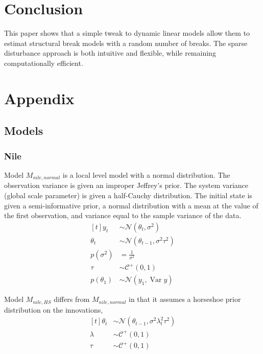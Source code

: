\documentclass{article}
\newcommand{\paren}[1]{\ensuremath{\left(#1\right)}}
\newcommand{\dnorm}[1]{\ensuremath{\mathcal{N}\paren{#1}}}
\newcommand{\dhalfcauchy}[1]{\ensuremath{\mathcal{C}^{+}\paren{#1}}}
\DeclareMathOperator{\Var}{Var}
\begin{document}
\section{Conclusion}
\label{sec:conclusion}

This paper shows that a simple tweak to dynamic linear models allow them to estimat structural break models with a random number of breaks.
The sparse disturbance approach is both intuitive and flexible, while remaining computationally efficient.

\clearpage{}
\section{Appendix}
\label{sec:appendix}

\subsection{Models}
\label{sec:models}

\subsubsection{Nile}
\label{sec:nile-1}

Model $M_{nile,normal}$ is a local level model with a normal distribution.
The observation variance is given an improper Jeffrey's prior.
The system variance (global scale parameter) is given a half-Cauchy distribution. 
The initial state is given a semi-informative prior, a normal distribution with a mean at the value of the first observation, and variance equal to the sample variance of the data.
\begin{equation}
  \label{eq:11}
  \begin{aligned}[t]
    y_{t} &\sim \dnorm{\theta_{t}, \sigma^{2}} \\
    \theta_{t} &\sim \dnorm{\theta_{t - 1}, \sigma^{2} \tau^{2}} \\
    p(\sigma^{2}) &= \frac{1}{\sigma^{2}} \\
    \tau &\sim \dhalfcauchy{0, 1} \\
    p(\theta_{1}) &\sim \dnorm{y_{1}, \Var{y}}
  \end{aligned}
\end{equation}

Model $M_{nile,HS}$ differs from $M_{nile,normal}$ in that it assumes a horseshoe prior distribution on 
the innovations,
\begin{equation}
  \label{eq:18}
  \begin{aligned}[t]
    \theta_{t} &\sim \dnorm{\theta_{t - 1}, \sigma^{2} \lambda_{t}^{2} \tau^{2}} \\
    \lambda &\sim \dhalfcauchy{0, 1} \\
    \tau &\sim \dhalfcauchy{0, 1}
  \end{aligned}
\end{equation}
\end{document}
